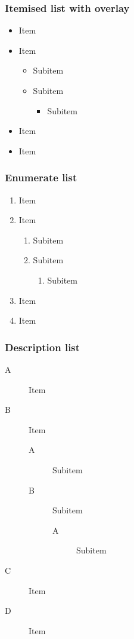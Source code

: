 \begin{frame}
\frametitle{Itemised list with overlay}
\begin{itemize}
\item Item\pause
\item Item\pause
    \begin{itemize}
    \item Subitem\pause
    \item Subitem\pause
        \begin{itemize}
        \item Subitem\pause
        \end{itemize}
    \end{itemize}
\item Item\pause
\item Item
\end{itemize}
\end{frame}

\begin{frame}
\frametitle{Enumerate list}
\begin{enumerate}
\item Item
\item Item
    \begin{enumerate}
    \item Subitem
    \item Subitem
        \begin{enumerate}
        \item Subitem
        \end{enumerate}
    \end{enumerate}
\item Item
\item Item
\end{enumerate}
\end{frame}

\begin{frame}
\frametitle{Description list}
\begin{description}
\item[A] Item
\item[B] Item
    \begin{description}
    \item[A] Subitem
    \item[B] Subitem
        \begin{description}
        \item[A] Subitem
        \end{description}
    \end{description}
\item[C] Item
\item[D] Item
\end{description}
\end{frame}

